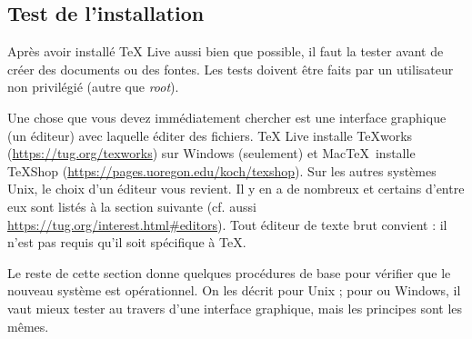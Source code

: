 \documentclass[german, english, french]{article}
\renewcommand{\TL}{\TeX{} Live\xspace}%
\newcommand\eng[1]{\foreignlanguage{english}{\emph{#1}}}
\begin{document}
\subsection{Test de l'installation}
\label{sec:test-install}

Après avoir installé \TL{} aussi bien que possible, il faut la tester avant de
créer des documents ou des fontes.  Les tests doivent être faits par un
utilisateur non privilégié (autre que \eng{root}).

Une chose que vous devez immédiatement chercher est une interface graphique (un
éditeur) avec laquelle éditer des fichiers. \TL{} installe \TeX{}works
(\url{https://tug.org/texworks}) sur Windows (seulement) et Mac\TeX\ installe
TeXShop (\url{https://pages.uoregon.edu/koch/texshop}). Sur les autres systèmes
Unix, le choix d'un éditeur vous revient. Il y en a de nombreux et certains
d'entre eux sont listés à la section suivante (cf. aussi
\url{https://tug.org/interest.html#editors}). Tout éditeur de texte brut
convient : il n'est pas requis qu'il soit spécifique à \TeX{}.

Le reste de cette section donne quelques procédures de base pour vérifier que le
nouveau système est opérationnel. On les décrit pour Unix ; pour \MacOSX{} ou
Windows, il vaut mieux tester au travers d'une interface graphique, mais les
principes sont les mêmes.
\end{document}
